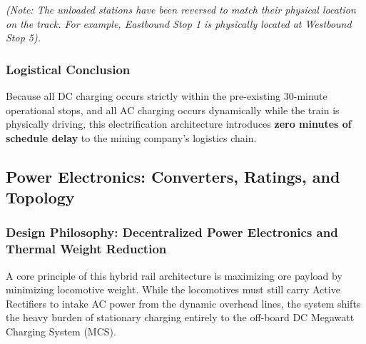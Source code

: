 \textit{(Note: The unloaded stations have been reversed to match their physical location on the track. For example, Eastbound Stop 1 is physically located at Westbound Stop 5).}

\begin{table}[h!]
\centering
\caption{Charging Durations and AC Infrastructure Requirements}
\vspace{0.5em}
\renewcommand{\arraystretch}{1.3}
\end{table}

\subsubsection*{Logistical Conclusion}
Because all DC charging occurs strictly within the pre-existing 30-minute operational stops, and all AC charging occurs dynamically while the train is physically driving, this electrification architecture introduces \textbf{zero minutes of schedule delay} to the mining company's logistics chain.

\subsection{Power Electronics: Converters, Ratings, and Topology}

\subsubsection*{Design Philosophy: Decentralized Power Electronics and Thermal Weight Reduction}
A core principle of this hybrid rail architecture is maximizing ore payload by minimizing locomotive weight. While the locomotives must still carry Active Rectifiers to intake AC power from the dynamic overhead lines, the system shifts the heavy burden of stationary charging entirely to the off-board DC Megawatt Charging System (MCS). 

